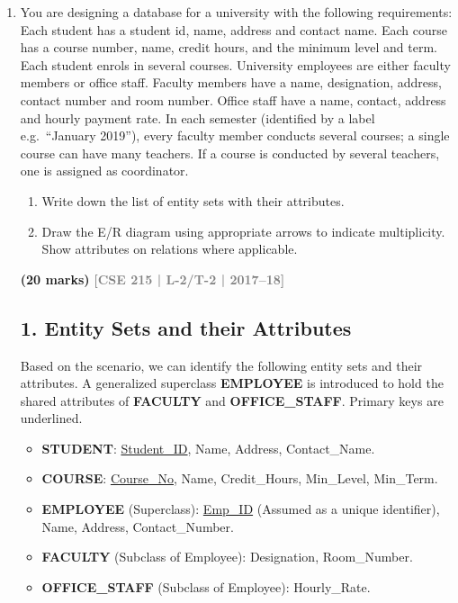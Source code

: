 \documentclass[12pt,a3paper]{article}
\newcommand{\yr}[1]{\hfill\textcolor{gray}{\small\textbf{[#1]}}}
\newcommand{\mk}[1]{\textcolor{orange!70!black}{\small\textbf{(#1 marks)}}}
\begin{document}
\begin{enumerate}
\item You are designing a database for a university with the following requirements: Each student has a student id, name, address and contact name. Each course has a course number, name, credit hours, and the minimum level and term. Each student enrols in several courses. University employees are either faculty members or office staff. Faculty members have a name, designation, address, contact number and room number. Office staff have a name, contact, address and hourly payment rate. In each semester (identified by a label e.g.\ ``January 2019''), every faculty member conducts several courses; a single course can have many teachers. If a course is conducted by several teachers, one is assigned as coordinator.
\begin{enumerate}
  \item Write down the list of entity sets with their attributes.
  \item Draw the E/R diagram using appropriate arrows to indicate multiplicity. Show attributes on relations where applicable.
\end{enumerate}
\mk{20} \yr{CSE 215 | L-2/T-2 | 2017--18}

\begin{tcolorbox}[enhanced,breakable,ansbox,colback=cA!4,colframe=cA,boxrule=0.8pt,arc=5pt,title={\textbf{Answer}},fonttitle=\bfseries\color{white},colbacktitle=cA]

\subsection*{1. Entity Sets and their Attributes}

Based on the scenario, we can identify the following entity sets and their attributes. A generalized superclass \textbf{EMPLOYEE} is introduced to hold the shared attributes of \textbf{FACULTY} and \textbf{OFFICE\_STAFF}. Primary keys are underlined.

\begin{itemize}[leftmargin=2em, itemsep=0.5em]
    \item \textbf{STUDENT}: \underline{Student\_ID}, Name, Address, Contact\_Name.
    \item \textbf{COURSE}: \underline{Course\_No}, Name, Credit\_Hours, Min\_Level, Min\_Term.
    \item \textbf{EMPLOYEE} (Superclass): \underline{Emp\_ID} (Assumed as a unique identifier), Name, Address, Contact\_Number.
    \item \textbf{FACULTY} (Subclass of Employee): Designation, Room\_Number.
    \item \textbf{OFFICE\_STAFF} (Subclass of Employee): Hourly\_Rate.
\end{itemize}


\end{tcolorbox}
\end{enumerate}
\end{document}
